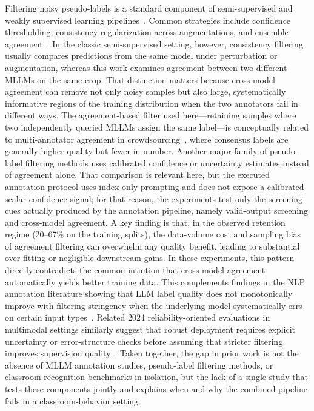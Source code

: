 \documentclass{ieeeaccess}
\begin{document}
Filtering noisy pseudo-labels is a standard component of
semi-supervised and weakly supervised learning
pipelines~\cite{sohn2020fixmatch,zhang2021flexmatch}.
Common strategies include confidence thresholding, consistency
regularization across augmentations, and ensemble
agreement~\cite{laine2016temporal}.
In the classic semi-supervised setting, however, consistency filtering
usually compares predictions from the same model under perturbation or
augmentation, whereas this work examines agreement between two
different MLLMs on the same crop.
That distinction matters because cross-model agreement can remove not
only noisy samples but also large, systematically informative regions
of the training distribution when the two annotators fail in different
ways.
The agreement-based filter used here---retaining samples where two independently
queried MLLMs assign the same label---is conceptually related to
multi-annotator agreement in crowdsourcing~\cite{snow2008cheap}, where
consensus labels are generally higher quality but fewer in number.
Another major family of pseudo-label filtering methods uses calibrated
confidence or uncertainty estimates instead of agreement alone.
That comparison is relevant here, but the executed annotation protocol
uses index-only prompting and does not expose a calibrated
scalar confidence signal; for that reason, the experiments test
only the screening cues actually produced by the annotation pipeline,
namely valid-output screening and cross-model agreement.
A key finding is that, in the observed retention regime
(20--67\% on the training splits), the data-volume cost and sampling
bias of agreement filtering can overwhelm any quality benefit, leading
to substantial over-fitting or negligible downstream gains.
In these experiments, this pattern directly contradicts the common
intuition that cross-model agreement automatically yields better
training data.
This complements findings in the NLP annotation literature showing that
LLM label quality does not monotonically improve with filtering
stringency when the underlying model systematically errs on certain
input types~\cite{he2023annollm}.
Related 2024 reliability-oriented evaluations in multimodal settings
similarly suggest that robust deployment requires explicit uncertainty
or error-structure checks before assuming that stricter filtering
improves supervision quality~\cite{zhang2024zero,yue2024mmmu}.
Taken together, the gap in prior work is not the absence of MLLM
annotation studies, pseudo-label filtering methods, or classroom
recognition benchmarks in isolation, but the lack of a single study
that tests these components jointly and explains when and why the
combined pipeline fails in a classroom-behavior setting.
\end{document}
